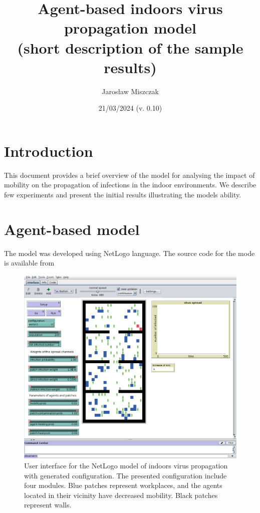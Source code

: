 \documentclass[10pt,a4paper]{article}
\title{Agent-based indoors virus propagation model\\(short description of the sample results)}
\author{Jarosław Miszczak}
\date{21/03/2024 (v. 0.10)}
\begin{document}
\maketitle



\section{Introduction}
This document provides a brief overview of the model for analysing the impact of mobility on the propagation of infections in the indoor environments. We describe few experiments and present the initial results illustrating the models ability.

\section{Agent-based model}

The model was developed using NetLogo language. The source code for the mode is available from \cite{model-src}

\begin{figure}[ht!]
\begin{center}
\includegraphics[scale=0.3]{plots/model-gui.png}
\end{center}
\caption{User interface for the NetLogo model of indoors virus propagation with generated configuration. The presented configuration include four modules. Blue patches represent workplaces, and the agents located in their vicinity have decreased mobility. Black patches represent walls.}
\label{fig:gui-world-3}
\end{figure}
\end{document}
